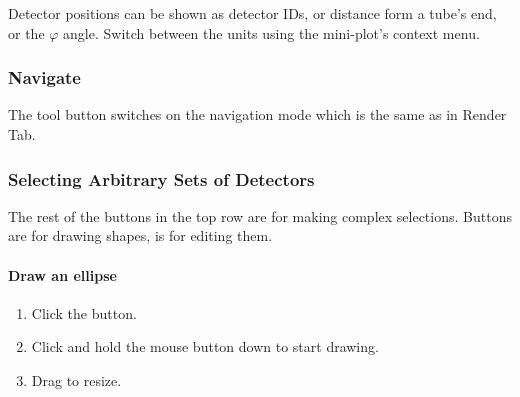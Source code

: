 \documentclass[letterpaper,10pt,english,openany]{sphinxmanual}
\begin{document}
\begin{DUlineblock}{0em}
\item[] 
\item[] Detector positions can be shown as detector IDs, or distance form a
tube’s end, or the \(\varphi\) angle. Switch between the units using the
mini-plot’s context menu.
\end{DUlineblock}

\begin{figure}[H]
\centering

\noindent{}
\end{figure}


\subsubsection{Navigate}
\label{\detokenize{mantid_basic_course/connecting_data_to_instruments/03_investigating_data:navigate}}
The  tool button switches on the navigation mode
which is the same as in Render Tab.


\subsubsection{Selecting Arbitrary Sets of Detectors}
\label{\detokenize{mantid_basic_course/connecting_data_to_instruments/03_investigating_data:selecting-arbitrary-sets-of-detectors}}
The rest of the buttons in the top row are for making complex
selections. Buttons
are for drawing shapes,  is for editing them.


\paragraph{Draw an ellipse}
\label{\detokenize{mantid_basic_course/connecting_data_to_instruments/03_investigating_data:draw-an-ellipse}}\begin{enumerate}
\def\theenumi{\arabic{enumi}}
\def\labelenumi{\theenumi .}
\makeatletter\def\p@enumii{\p@enumi \theenumi .}\makeatother
\item {} 
Click the  button.

\item {} 
Click and hold the mouse button down to start drawing.

\item {} 
Drag to resize.

\end{enumerate}
\end{document}
